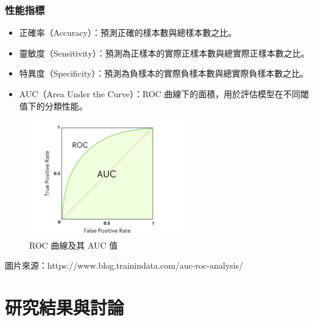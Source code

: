 \documentclass[xcolor=dvipsnames]{beamer}
\begin{document}
    \begin{frame}
        \frametitle{性能指標}
        \begin{itemize}
            \item 正確率（Accuracy）：預測正確的樣本數與總樣本數之比。
            \item 靈敏度（Sensitivity）：預測為正樣本的實際正樣本數與總實際正樣本數之比。
            \item 特異度（Specificity）：預測為負樣本的實際負樣本數與總實際負樣本數之比。
            \item AUC（Area Under the Curve）：ROC 曲線下的面積，用於評估模型在不同閾值下的分類性能。
        \end{itemize}
    \end{frame}

    \begin{frame}
        \begin{figure}
            \centering
            \includegraphics[width=0.6\textwidth]{src/auc.png}
            \caption{ROC 曲線及其 AUC 值}
            \label{fig:roc_curve_example}
        \end{figure}
        圖片來源：https://www.blog.trainindata.com/auc-roc-analysis/
    \end{frame}

    \section{研究結果與討論}
    \begin{frame}
        \sectionpage
    \end{frame}
\end{document}
